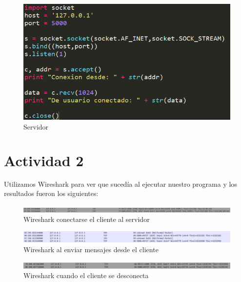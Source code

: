 \documentclass[onecolumn,11pts]{IEEEtran}
\begin{document}
\begin{figure}[h!]
\centering
 \includegraphics[scale=0.5]{server}
\caption{Servidor}
\label{fig:server}
\end{figure}
\newpage
\section{Actividad 2}
Utilizamos Wireshark para ver que sucedía al ejecutar nuestro programa y los resultados fueron los siguientes: 
\begin{figure}[h!]
\centering
 \includegraphics[scale=0.55]{ws1}
\caption{Wireshark conectarse el cliente al servidor}
\label{fig:ws1}
\end{figure}
\begin{figure}[h!]
\centering
 \includegraphics[scale=0.55]{ws2}
\caption{Wireshark al enviar mensajes desde el cliente}
\label{fig:ws2}
\end{figure}
\begin{figure}[h!]
\centering
 \includegraphics[scale=0.55]{ws3}
\caption{Wireshark cuando el cliente se desconecta}
\label{fig:ws3}
\end{figure}

\newpage
\end{document}
